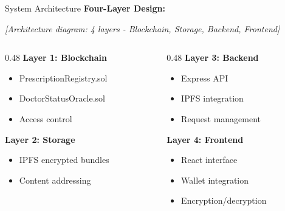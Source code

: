 \documentclass[10pt]{beamer}
\begin{document}
\begin{frame}{System Architecture}
\textbf{Four-Layer Design:}

\vspace{0.2cm}
\begin{center}
\textit{[Architecture diagram: 4 layers - Blockchain, Storage, Backend, Frontend]}
\end{center}

\vspace{0.2cm}
\begin{columns}[T]
\begin{column}{0.48\textwidth}
\textbf{Layer 1: Blockchain}
\begin{itemize}
\item PrescriptionRegistry.sol
\item DoctorStatusOracle.sol
\item Access control
\end{itemize}

\textbf{Layer 2: Storage}
\begin{itemize}
\item IPFS encrypted bundles
\item Content addressing
\end{itemize}
\end{column}

\begin{column}{0.48\textwidth}
\textbf{Layer 3: Backend}
\begin{itemize}
\item Express API
\item IPFS integration
\item Request management
\end{itemize}

\textbf{Layer 4: Frontend}
\begin{itemize}
\item React interface
\item Wallet integration
\item Encryption/decryption
\end{itemize}
\end{column}
\end{columns}
\end{frame}
\end{document}
